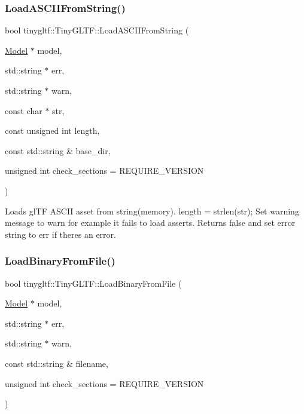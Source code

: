 \subsubsection{\texorpdfstring{Load\+A\+S\+C\+I\+I\+From\+String()}{LoadASCIIFromString()}}
{\footnotesize\ttfamily bool tinygltf\+::\+Tiny\+G\+L\+T\+F\+::\+Load\+A\+S\+C\+I\+I\+From\+String (\begin{DoxyParamCaption}\item[{\hyperlink{classtinygltf_1_1Model}{Model} $\ast$}]{model,  }\item[{std\+::string $\ast$}]{err,  }\item[{std\+::string $\ast$}]{warn,  }\item[{const char $\ast$}]{str,  }\item[{const unsigned int}]{length,  }\item[{const std\+::string \&}]{base\+\_\+dir,  }\item[{unsigned int}]{check\+\_\+sections = {\ttfamily REQUIRE\+\_\+VERSION} }\end{DoxyParamCaption})}

Loads gl\+TF A\+S\+C\+II asset from string(memory). {\ttfamily length} = strlen(str); Set warning message to {\ttfamily warn} for example it fails to load asserts. Returns false and set error string to {\ttfamily err} if there\textquotesingle{}s an error. \mbox{\label{classtinygltf_1_1TinyGLTF_a6fcc0f27b3973a1a0c1afe39f7c52c51}} 
\subsubsection{\texorpdfstring{Load\+Binary\+From\+File()}{LoadBinaryFromFile()}}
{\footnotesize\ttfamily bool tinygltf\+::\+Tiny\+G\+L\+T\+F\+::\+Load\+Binary\+From\+File (\begin{DoxyParamCaption}\item[{\hyperlink{classtinygltf_1_1Model}{Model} $\ast$}]{model,  }\item[{std\+::string $\ast$}]{err,  }\item[{std\+::string $\ast$}]{warn,  }\item[{const std\+::string \&}]{filename,  }\item[{unsigned int}]{check\+\_\+sections = {\ttfamily REQUIRE\+\_\+VERSION} }\end{DoxyParamCaption})}

